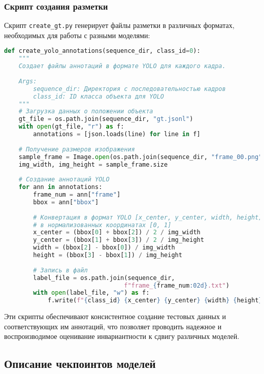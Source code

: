 \subsubsection{Скрипт создания разметки}
\label{experiments:setup:data_generation:gt}

Скрипт \texttt{create\_gt.py} генерирует файлы разметки в различных форматах, необходимых для работы с разными моделями:

\begin{lstlisting}[language=Python, caption={Генерация разметки для моделей детекции}, label={lst:create_gt}]
def create_yolo_annotations(sequence_dir, class_id=0):
    """
    Создает файлы аннотаций в формате YOLO для каждого кадра.
    
    Args:
        sequence_dir: Директория с последовательностью кадров
        class_id: ID класса объекта для YOLO
    """
    # Загрузка данных о положении объекта
    gt_file = os.path.join(sequence_dir, "gt.jsonl")
    with open(gt_file, "r") as f:
        annotations = [json.loads(line) for line in f]
    
    # Получение размеров изображения
    sample_frame = Image.open(os.path.join(sequence_dir, "frame_00.png"))
    img_width, img_height = sample_frame.size
    
    # Создание аннотаций YOLO
    for ann in annotations:
        frame_num = ann["frame"]
        bbox = ann["bbox"]
        
        # Конвертация в формат YOLO [x_center, y_center, width, height]
        # в нормализованных координатах [0, 1]
        x_center = (bbox[0] + bbox[2]) / 2 / img_width
        y_center = (bbox[1] + bbox[3]) / 2 / img_height
        width = (bbox[2] - bbox[0]) / img_width
        height = (bbox[3] - bbox[1]) / img_height
        
        # Запись в файл
        label_file = os.path.join(sequence_dir, 
                                 f"frame_{frame_num:02d}.txt")
        with open(label_file, "w") as f:
            f.write(f"{class_id} {x_center} {y_center} {width} {height}")
\end{lstlisting}

Эти скрипты обеспечивают консистентное создание тестовых данных и соответствующих им аннотаций, что позволяет проводить надежное и воспроизводимое оценивание инвариантности к сдвигу различных моделей.

\subsection{Описание чекпоинтов моделей}
\label{experiments:setup:checkpoints}

